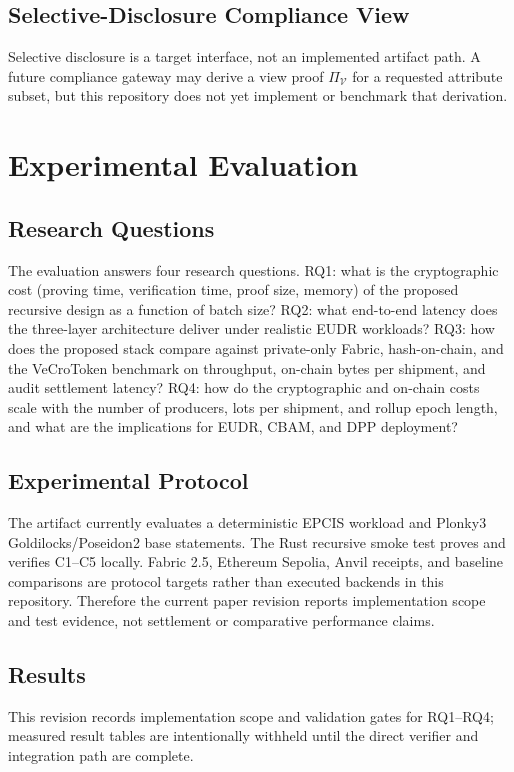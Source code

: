 \documentclass[journal]{IEEEtran}
\begin{document}
\subsection{Selective-Disclosure Compliance View}
Selective disclosure is a target interface, not an implemented artifact path. A future compliance gateway may derive a view proof $\Pi_\mathcal{V}$ for a requested attribute subset, but this repository does not yet implement or benchmark that derivation.

\section{Experimental Evaluation}
\label{sec:experiments}

\subsection{Research Questions}
The evaluation answers four research questions. RQ1: what is the cryptographic cost (proving time, verification time, proof size, memory) of the proposed recursive design as a function of batch size? RQ2: what end-to-end latency does the three-layer architecture deliver under realistic EUDR workloads? RQ3: how does the proposed stack compare against private-only Fabric, hash-on-chain, and the VeCroToken benchmark on throughput, on-chain bytes per shipment, and audit settlement latency? RQ4: how do the cryptographic and on-chain costs scale with the number of producers, lots per shipment, and rollup epoch length, and what are the implications for EUDR, CBAM, and DPP deployment?

\subsection{Experimental Protocol}
The artifact currently evaluates a deterministic EPCIS workload and Plonky3 Goldilocks/Poseidon2 base statements. The Rust recursive smoke test proves and verifies C1--C5 locally. Fabric 2.5, Ethereum Sepolia, Anvil receipts, and baseline comparisons are protocol targets rather than executed backends in this repository. Therefore the current paper revision reports implementation scope and test evidence, not settlement or comparative performance claims.

\subsection{Results}
This revision records implementation scope and validation gates for RQ1--RQ4; measured result tables are intentionally withheld until the direct verifier and integration path are complete.
\end{document}
